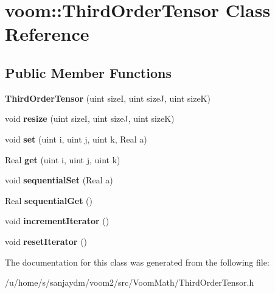 \hypertarget{classvoom_1_1_third_order_tensor}{
\section{voom::ThirdOrderTensor Class Reference}
\label{classvoom_1_1_third_order_tensor}
}
\subsection*{Public Member Functions}
\begin{DoxyCompactItemize}
\item 
\hypertarget{classvoom_1_1_third_order_tensor_a12696b5c439afe17db64a0aadc53589e}{
{\bfseries ThirdOrderTensor} (uint sizeI, uint sizeJ, uint sizeK)}
\label{classvoom_1_1_third_order_tensor_a12696b5c439afe17db64a0aadc53589e}

\item 
\hypertarget{classvoom_1_1_third_order_tensor_aa28ef3ba14892c0bc55a63658b802b78}{
void {\bfseries resize} (uint sizeI, uint sizeJ, uint sizeK)}
\label{classvoom_1_1_third_order_tensor_aa28ef3ba14892c0bc55a63658b802b78}

\item 
\hypertarget{classvoom_1_1_third_order_tensor_a1bdd0a1c84c46a7cc41ef9ede607bb9d}{
void {\bfseries set} (uint i, uint j, uint k, Real a)}
\label{classvoom_1_1_third_order_tensor_a1bdd0a1c84c46a7cc41ef9ede607bb9d}

\item 
\hypertarget{classvoom_1_1_third_order_tensor_a5d16ec7a14cfb36f8e2d1a9b49fa366f}{
Real {\bfseries get} (uint i, uint j, uint k)}
\label{classvoom_1_1_third_order_tensor_a5d16ec7a14cfb36f8e2d1a9b49fa366f}

\item 
\hypertarget{classvoom_1_1_third_order_tensor_ad83f78a740f9420e7515fb004434724e}{
void {\bfseries sequentialSet} (Real a)}
\label{classvoom_1_1_third_order_tensor_ad83f78a740f9420e7515fb004434724e}

\item 
\hypertarget{classvoom_1_1_third_order_tensor_a8bd25cbcbbea8fa5aff5335faaea3213}{
Real {\bfseries sequentialGet} ()}
\label{classvoom_1_1_third_order_tensor_a8bd25cbcbbea8fa5aff5335faaea3213}

\item 
\hypertarget{classvoom_1_1_third_order_tensor_ab3bd9676e0c91c05d831e1ead4a21da5}{
void {\bfseries incrementIterator} ()}
\label{classvoom_1_1_third_order_tensor_ab3bd9676e0c91c05d831e1ead4a21da5}

\item 
\hypertarget{classvoom_1_1_third_order_tensor_a2c6a041c88f86f0c6b30f870af178624}{
void {\bfseries resetIterator} ()}
\label{classvoom_1_1_third_order_tensor_a2c6a041c88f86f0c6b30f870af178624}

\end{DoxyCompactItemize}


The documentation for this class was generated from the following file:\begin{DoxyCompactItemize}
\item 
/u/home/s/sanjaydm/voom2/src/VoomMath/ThirdOrderTensor.h\end{DoxyCompactItemize}
